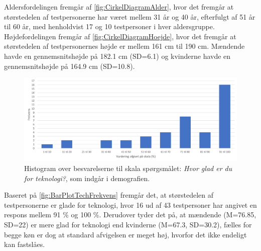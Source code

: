 \noindent
%
Aldersfordelingen fremgår af \autoref{fig:CirkelDiagramAlder}, hvor det fremgår at størstedelen af testpersonerne har været mellem 31 år og 40 år, efterfulgt af 51 år til 60 år, med henholdvist 17 og 10 testpersoner i hver aldersgruppe. Højdefordelingen fremgår af \autoref{fig:CirkelDiagramHoejde}, hvor det fremgår at størstedelen af testpersonernes højde er mellem 161 cm til 190 cm. Mændende havde en gennemsnitshøjde på 182.1 cm (SD=6.1) og kvinderne havde en gennemsnitshøjde på 164.9 cm (SD=10.8). 
%
\begin{figure}[H]
\centering
\includegraphics[width = \textwidth]{Figure/DatabehandlingSkalaer/TechFrekvens} 
\caption{Histogram over besvarelserne til skala spørgsmålet: \textit{Hvor glad er du for teknologi?}, som indgår i demografien.}
\label{fig:BarPlotTechFrekvens}
\end{figure}
\noindent
%
Baseret på \autoref{fig:BarPlotTechFrekvens} fremgår det, at størstedelen af testpersonerne er glade for teknologi, hvor 16 ud af 43 testpersoner har angivet en respons mellem 91 \% og 100 \%. Derudover tyder det på, at mændende (M=76.85, SD=22) er mere glad for teknologi end kvinderne (M=67.3, SD=30.2), fælles for begge køn er dog at standard afvigelsen er meget høj, hvorfor det ikke endeligt kan fastslåes. 






